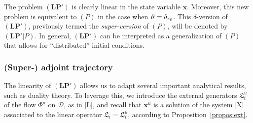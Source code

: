 \documentclass[sn-mathphys-num]{sn-jnl}
\numberwithin{equation}{section}
\theoremstyle{mythm}
\theoremstyle{mydef}
\begin{document}
The problem $(\bm{LP}')$ is clearly linear in the state variable $\bm{x}$. Moreover, this new problem is equivalent to $(P)$ in the case when $\vartheta = \delta_{{\rm x}_0}$. This $\delta$-version of $(\bm{LP}')$, previously termed the \emph{super-version} of $(P)$, will be denoted by $(\bm{LP}'|P)$.  In general, $(\bm{LP}')$ can be interpreted as a generalization of $(P)$ that allows for ``distributed'' initial conditions. 
  
\subsubsection{(Super-) adjoint trajectory}

The linearity of $(\bm{LP}')$ allows us to adapt several important analytical results, such as duality theory. To leverage this, we introduce the external generators $\mathfrak{L}_t^u$ of the flow $\Phi^u$ on $\bm{\mathcal D}$, as in \eqref{L}, and recall that $\bm x^u$ is a solution of the system \eqref{X} associated to the linear operator $\mathfrak{L}_t = \mathfrak{L}_t^u$, according to Proposition~\ref{propos:ext}. 
\end{document}
